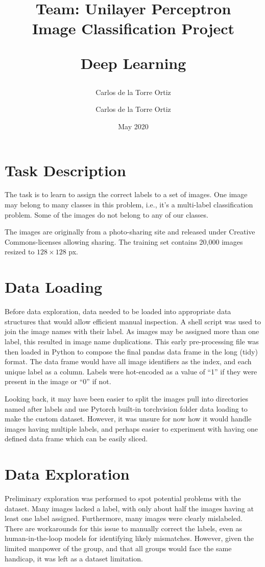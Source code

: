 \documentclass{article}
\author{Carlos de la Torre Ortiz}
\title{{\large Team: Unilayer Perceptron} \\\vspace{0.1\textwidth}
{\Large \textbf{Image Classification Project}} \vspace{0.15\textwidth}
    \begin{center}
        Deep Learning
    \end{center}}
\author{Carlos de la Torre Ortiz}
\date{May 2020}
\begin{document}
\maketitle
\begin{center}
\vspace{0.2\textwidth}
\end{center}
\clearpage

\section{Task Description}

The task is to learn to assign the correct labels to a set of images.
One image may belong to many classes in this problem, i.e., it's a multi-label classification problem.
Some of the images do not belong to any of our classes.

The images are originally from a photo-sharing site and released under Creative Commons-licenses allowing sharing.
The training set contains 20,000 images resized to \(128 \times 128\) px.

\section{Data Loading}
Before data exploration, data needed to be loaded into appropriate data structures that would allow efficient manual inspection.
A shell script was used to join the image names with their label.
As images may be assigned more than one label, this resulted in image name duplications.
This early pre-processing file was then loaded in Python to compose the final pandas data frame in the long (tidy) format.
The data frame would have all image identifiers as the index, and each unique label as a column.
Labels were hot-encoded as a value of ``1'' if they were present in the image or ``0'' if not.

Looking back, it may have been easier to split the images pull into directories named after labels and use Pytorch built-in torchvision folder data loading to make the custom dataset.
However, it was unsure for now how it would handle images having multiple labels, and perhaps easier to experiment with having one defined data frame which can be easily sliced.

\section{Data Exploration}
Preliminary exploration was performed to spot potential problems with the dataset.
Many images lacked a label, with only about half the images having at least one label assigned.
Furthermore, many images were clearly mislabeled.
There are workarounds for this issue to manually correct the labels, even as human-in-the-loop models for identifying likely mismatches.
However, given the limited manpower of the group, and that all groups would face the same handicap, it was left as a dataset limitation.
\end{document}
